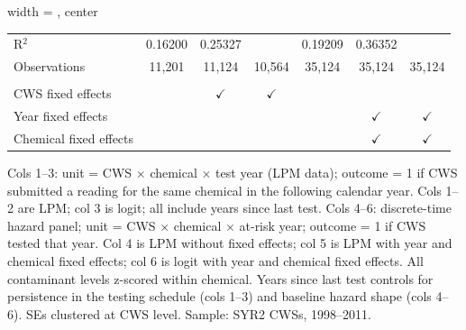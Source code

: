 \begin{table}[htbp]
\begin{adjustbox}{width = \textwidth, center}
\begin{tabular}{lcccccc}
          \\
         
         R$^2$                  & 0.16200         & 0.25327         &                 & 0.19209         & 0.36352         & \\  
         Observations           & 11,201          & 11,124          & 10,564          & 35,124          & 35,124          & 35,124\\  
         
          \\
         
         CWS fixed effects      &                 & $\checkmark$    & $\checkmark$    &                 &                 & \\  
         Year fixed effects     &                 &                 &                 &                 & $\checkmark$    & $\checkmark$\\   
         Chemical fixed effects &                 &                 &                 &                 & $\checkmark$    & $\checkmark$\\   
         
         \bottomrule
         
      \end{tabular}
      
      
      
   \end{adjustbox}
      {\tiny\linespread{1}\selectfont \par \raggedright 
   Cols 1--3: unit = CWS $\times$ chemical $\times$ test year (LPM data); outcome = 1 if CWS submitted a reading for the same chemical in the following calendar year. Cols 1--2 are LPM; col 3 is logit; all include years since last test. Cols 4--6: discrete-time hazard panel; unit = CWS $\times$ chemical $\times$ at-risk year; outcome = 1 if CWS tested that year. Col 4 is LPM without fixed effects; col 5 is LPM with year and chemical fixed effects; col 6 is logit with year and chemical fixed effects. All contaminant levels z-scored within chemical. Years since last test controls for persistence in the testing schedule (cols 1--3) and baseline hazard shape (cols 4--6). SEs clustered at CWS level. Sample: SYR2 CWSs, 1998--2011.}
   
\end{table}


